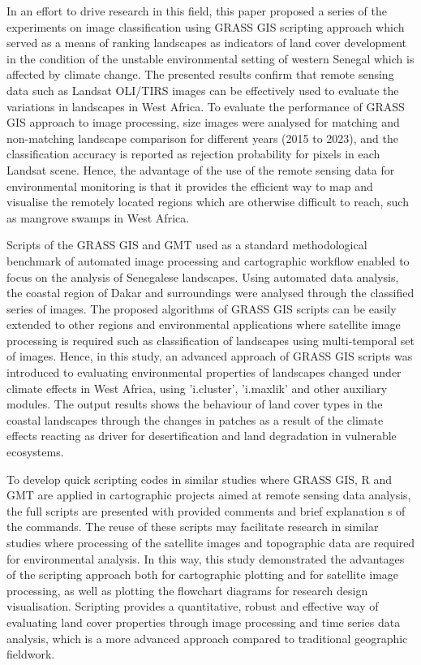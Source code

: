 \documentclass[land,article,submit,pdftex,moreauthors]{Definitions/mdpi}
\begin{document}
In an effort to drive research in this field, this paper proposed a series of the experiments on image classification using GRASS GIS scripting approach which served as a means of ranking landscapes as indicators of land cover development in the condition of the unstable environmental setting of western Senegal which is affected by climate change. The presented results confirm that remote sensing data such as Landsat OLI/TIRS images can be effectively used to evaluate the variations in landscapes in West Africa. To evaluate the performance of GRASS GIS approach to image processing, size images were analysed for matching and non-matching landscape comparison for different years (2015 to 2023), and the classification accuracy is reported as rejection probability for pixels in each Landsat scene. Hence, the advantage of the use of the remote sensing data for environmental monitoring is that it provides the efficient way to map and visualise the remotely located regions which are otherwise difficult to reach, such as mangrove swamps in West Africa. 

Scripts of the GRASS GIS and GMT used as a standard methodological benchmark of automated image processing and cartographic workflow enabled to focus on the analysis of Senegalese landscapes. Using automated data analysis, the coastal region of Dakar and surroundings were analysed through the classified series of images. The proposed algorithms of GRASS GIS scripts can be easily extended to other regions and environmental applications where satellite image processing is required such as classification of landscapes using multi-temporal set of images. Hence, in this study, an advanced approach of GRASS GIS scripts was  introduced to evaluating environmental properties of landscapes changed under climate effects in West Africa, using 'i.cluster', 'i.maxlik' and other auxiliary modules. The output results shows the behaviour of land cover types in the coastal landscapes through the changes in patches as a result of the climate effects reacting as driver for desertification and land degradation in vulnerable ecosystems. 

To develop quick scripting codes in similar studies where GRASS GIS, R and GMT are applied in cartographic projects aimed at remote sensing data analysis, the full scripts are presented with provided comments and brief explanation s of the commands. The reuse of these scripts may facilitate research in similar studies where processing of the satellite images and topographic data are required for environmental analysis. In this way, this study demonstrated the advantages of the scripting approach both for cartographic plotting and for satellite image processing, as well as plotting the flowchart diagrams for research design visualisation. Scripting provides a quantitative, robust and effective way of evaluating land cover properties through image processing and time series data analysis, which is a more advanced approach compared to traditional geographic fieldwork. 
\end{document}
